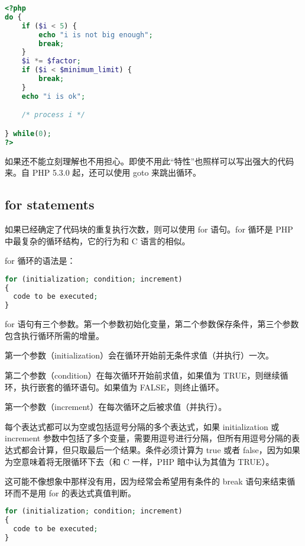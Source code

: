 \begin{lstlisting}[language=PHP]
<?php
do {
    if ($i < 5) {
        echo "i is not big enough";
        break;
    }
    $i *= $factor;
    if ($i < $minimum_limit) {
        break;
    }
    echo "i is ok";

    /* process i */

} while(0);
?>
\end{lstlisting}

如果还不能立刻理解也不用担心。即使不用此“特性”也照样可以写出强大的代码来。自 PHP 5.3.0 起，还可以使用 goto 来跳出循环。


\subsection{for statements}

如果已经确定了代码块的重复执行次数，则可以使用 for 语句。for 循环是 PHP 中最复杂的循环结构，它的行为和 C 语言的相似。 

for 循环的语法是：




\begin{lstlisting}[language=PHP]
for (initialization; condition; increment)
{
  code to be executed;
}
\end{lstlisting}




for 语句有三个参数。第一个参数初始化变量，第二个参数保存条件，第三个参数包含执行循环所需的增量。

\begin{compactitem}
\item 第一个参数（initialization）会在循环开始前无条件求值（并执行）一次。
\item 第二个参数（condition）在每次循环开始前求值，如果值为 TRUE，则继续循环，执行嵌套的循环语句。如果值为 FALSE，则终止循环。
\item 第一个参数（increment）在每次循环之后被求值（并执行）。
\end{compactitem}




每个表达式都可以为空或包括逗号分隔的多个表达式，如果 initialization 或 increment 参数中包括了多个变量，需要用逗号进行分隔，但所有用逗号分隔的表达式都会计算，但只取最后一个结果。条件必须计算为 true 或者 false，因为如果为空意味着将无限循环下去（和 C 一样，PHP 暗中认为其值为 TRUE）。

这可能不像想象中那样没有用，因为经常会希望用有条件的 break 语句来结束循环而不是用 for 的表达式真值判断。

\begin{lstlisting}[language=PHP]
for (initialization; condition; increment)
{
  code to be executed;
}
\end{lstlisting}

